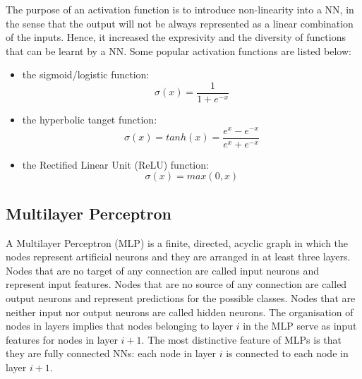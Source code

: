 The purpose of an activation function is to introduce non-linearity into a NN, in the sense that the output will not be always represented as a linear combination of the inputs. Hence, it increased the expresivity and the diversity of functions that can be learnt by a NN. Some popular activation functions are listed below:\\

\begin{itemize}
  \item the sigmoid/logistic function: \\
        \begin{equation}
          \sigma(x) = \frac{1}{1 + e^{-x}}
        \end{equation}

  \item the hyperbolic tanget function: \\
        \begin{equation}
          \sigma(x) = tanh(x) = \frac{e^{x} - e^{-x}}{e^{x} + e^{-x}}
        \end{equation}

  \item the Rectified Linear Unit (ReLU) function: \\
        \begin{equation}
          \sigma(x) = max(0,x)
        \end{equation}
\end{itemize}


\subsection{Multilayer Perceptron}

A Multilayer Perceptron (MLP) is a finite, directed, acyclic graph in which the nodes represent artificial neurons and they are arranged in at least three layers. Nodes that are no target of any connection are called input neurons and represent input features. Nodes that are no source of any connection are called output neurons and represent predictions for the possible classes. Nodes that are neither input nor output neurons are called hidden neurons. The organisation of nodes in layers implies that nodes belonging to layer $i$ in the MLP serve as input features for nodes in layer $i+1$. The most distinctive feature of MLPs is that they are fully connected NNs: each node in layer $i$ is connected to each node in layer $i+1$. \\

